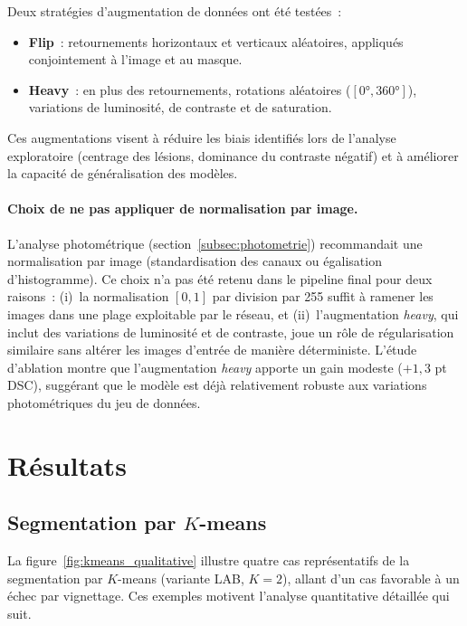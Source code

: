 \documentclass[12pt,a4paper]{article}
\begin{document}
Deux stratégies d'augmentation de données ont été testées~:
\begin{itemize}[nosep]
    \item \textbf{Flip}~: retournements horizontaux et verticaux aléatoires, appliqués conjointement à l'image et au masque.
    \item \textbf{Heavy}~: en plus des retournements, rotations aléatoires ($[0°, 360°]$), variations de luminosité, de contraste et de saturation.
\end{itemize}

Ces augmentations visent à réduire les biais identifiés lors de l'analyse exploratoire (centrage des lésions, dominance du contraste négatif) et à améliorer la capacité de généralisation des modèles.

\paragraph{Choix de ne pas appliquer de normalisation par image.} L'analyse photométrique (section~\ref{subsec:photometrie}) recommandait une normalisation par image (standardisation des canaux ou égalisation d'histogramme). Ce choix n'a pas été retenu dans le pipeline final pour deux raisons~: (i)~la normalisation $[0, 1]$ par division par 255 suffit à ramener les images dans une plage exploitable par le réseau, et (ii)~l'augmentation \emph{heavy}, qui inclut des variations de luminosité et de contraste, joue un rôle de régularisation similaire sans altérer les images d'entrée de manière déterministe. L'étude d'ablation montre que l'augmentation \emph{heavy} apporte un gain modeste ($+1{,}3$ pt DSC), suggérant que le modèle est déjà relativement robuste aux variations photométriques du jeu de données.


\section{Résultats}
\label{sec:resultats}

\subsection{Segmentation par $K$-means}
\label{subsec:resultats_kmeans}

La figure~\ref{fig:kmeans_qualitative} illustre quatre cas représentatifs de la segmentation par $K$-means (variante LAB, $K = 2$), allant d'un cas favorable à un échec par vignettage. Ces exemples motivent l'analyse quantitative détaillée qui suit.
\end{document}

